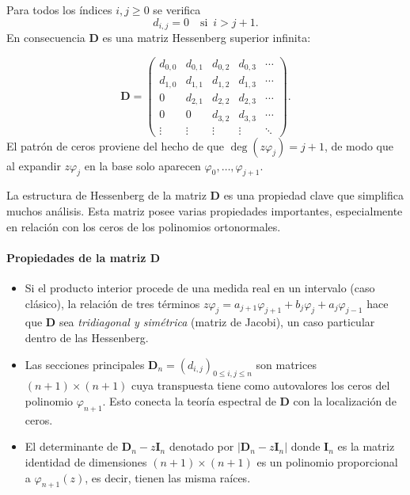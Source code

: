 \begin{proposition}\label{prop:matriz_hessenberg}
	Para todos los índices \(i,j\ge0\) se verifica
	\[
		d_{i,j}=0
		\quad\text{si }\,i>j+1.
	\]
	En consecuencia
	\(\mathbf{D}\) es una matriz Hessenberg superior infinita:

	\[
		\mathbf{D}=\begin{pmatrix}
			d_{0,0} & d_{0,1} & d_{0,2} & d_{0,3} & \cdots \\
			d_{1,0} & d_{1,1} & d_{1,2} & d_{1,3} & \cdots \\
			0       & d_{2,1} & d_{2,2} & d_{2,3} & \cdots \\
			0       & 0       & d_{3,2} & d_{3,3} & \cdots \\
			\vdots  & \vdots  & \vdots  & \vdots  & \ddots
		\end{pmatrix}.
	\]
	El patrón de ceros proviene del hecho de que
	\(\deg(z\varphi_j)=j+1\), de modo que al expandir \(z\varphi_j\) en la base
	solo aparecen \(\varphi_0,\dots,\varphi_{j+1}\).
\end{proposition}

La estructura de Hessenberg de la matriz $\mathbf{D}$ es una propiedad clave que simplifica muchos análisis. Esta matriz posee varias propiedades importantes, especialmente en relación con los ceros de los polinomios ortonormales.

\paragraph{Propiedades de la matriz $\mathbf{D}$}
\begin{itemize}
	\item Si el producto interior procede de una medida real en un intervalo
	      (caso clásico), la relación de tres términos
	      \(z\varphi_j=a_{j+1}\varphi_{j+1}+b_j\varphi_j+a_j\varphi_{j-1}\)
	      hace que \(\mathbf{D}\) sea \emph{tridiagonal y simétrica} (matriz de Jacobi),
	      un caso particular dentro de las Hessenberg.
	\item Las secciones principales
	      \(\mathbf{D}_n=(d_{i,j})_{0\le i,j\le n}\) son matrices \((n+1)\times(n+1)\)
	      cuya transpuesta tiene como autovalores los ceros del polinomio
	      \(\varphi_{n+1}\).
	      Esto conecta la teoría espectral de \(\mathbf{D}\) con la localización de ceros.
	\item El determinante de $\mathbf{D}_n -z \mathbf{I}_n$ denotado por $\vert \mathbf{D}_n -z \mathbf{I}_n\vert $ donde $\mathbf{I}_n$ es la matriz identidad de dimensiones $(n+1)\times (n+1)$ es un polinomio proporcional a $\varphi_{n+1}(z)$, es decir, tienen las misma raíces.
\end{itemize}

